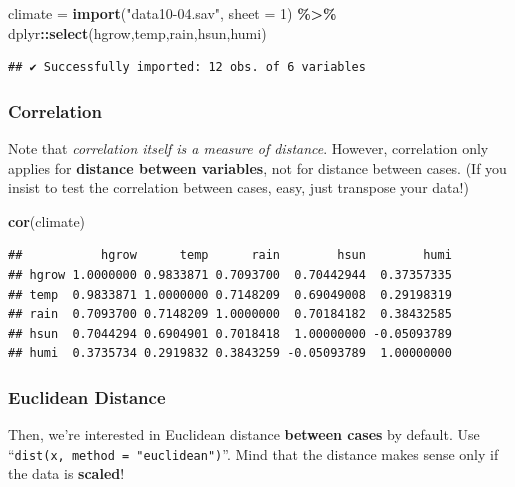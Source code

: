 \documentclass[
]{ctexart}
\newenvironment{Shaded}{\begin{snugshade}}{\end{snugshade}}
\newcommand{\AttributeTok}[1]{\textcolor[rgb]{0.13,0.29,0.53}{#1}}
\newcommand{\DecValTok}[1]{\textcolor[rgb]{0.00,0.00,0.81}{#1}}
\newcommand{\FunctionTok}[1]{\textcolor[rgb]{0.13,0.29,0.53}{\textbf{#1}}}
\newcommand{\NormalTok}[1]{#1}
\newcommand{\OtherTok}[1]{\textcolor[rgb]{0.56,0.35,0.01}{#1}}
\newcommand{\SpecialCharTok}[1]{\textcolor[rgb]{0.81,0.36,0.00}{\textbf{#1}}}
\newcommand{\StringTok}[1]{\textcolor[rgb]{0.31,0.60,0.02}{#1}}
\begin{document}
\begin{Shaded}
\begin{Highlighting}[]
\NormalTok{climate }\OtherTok{=} \FunctionTok{import}\NormalTok{(}\StringTok{"data10{-}04.sav"}\NormalTok{, }\AttributeTok{sheet =} \DecValTok{1}\NormalTok{) }\SpecialCharTok{\%\textgreater{}\%} 
\NormalTok{  dplyr}\SpecialCharTok{::}\FunctionTok{select}\NormalTok{(hgrow,temp,rain,hsun,humi)}
\end{Highlighting}
\end{Shaded}

\begin{verbatim}
## ✔ Successfully imported: 12 obs. of 6 variables
\end{verbatim}

\hypertarget{correlation-1}{%
\subsubsection{Correlation}\label{correlation-1}}

Note that \emph{correlation itself is a measure of distance}. However,
correlation only applies for \textbf{distance between variables}, not
for distance between cases. (If you insist to test the correlation
between cases, easy, just transpose your data!)

\begin{Shaded}
\begin{Highlighting}[]
\FunctionTok{cor}\NormalTok{(climate)}
\end{Highlighting}
\end{Shaded}

\begin{verbatim}
##           hgrow      temp      rain        hsun        humi
## hgrow 1.0000000 0.9833871 0.7093700  0.70442944  0.37357335
## temp  0.9833871 1.0000000 0.7148209  0.69049008  0.29198319
## rain  0.7093700 0.7148209 1.0000000  0.70184182  0.38432585
## hsun  0.7044294 0.6904901 0.7018418  1.00000000 -0.05093789
## humi  0.3735734 0.2919832 0.3843259 -0.05093789  1.00000000
\end{verbatim}

\hypertarget{euclidean-distance}{%
\subsubsection{Euclidean Distance}\label{euclidean-distance}}

Then, we're interested in Euclidean distance \textbf{between cases} by
default. Use ``\texttt{dist(x,\ method\ =\ "euclidean")}''. Mind that
the distance makes sense only if the data is \textbf{scaled}!
\end{document}
